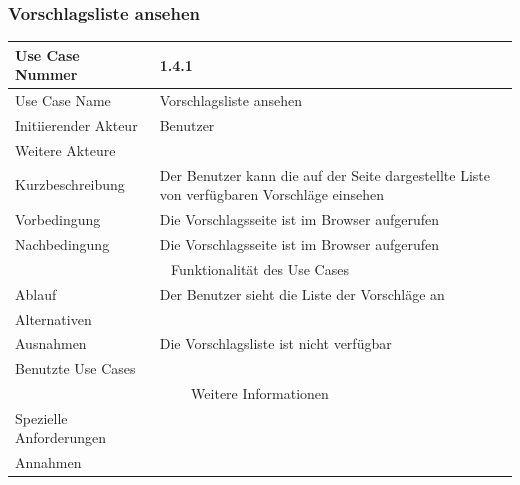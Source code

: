 \documentclass[10pt,a4paper]{article}
\begin{document}
	\subsubsection{Vorschlagsliste ansehen}
	\begin{tabular}{|l|p{.5\linewidth}|}
		\hline Use Case Nummer & 1.4.1 \\ 
		\hline Use Case Name & Vorschlagsliste ansehen \\ 
		\hline Initiierender Akteur & Benutzer \\
		\hline Weitere Akteure & \\
		\hline Kurzbeschreibung & Der Benutzer kann die auf der Seite dargestellte Liste von verf\"ugbaren Vorschl\"age einsehen \\
		\hline Vorbedingung & Die Vorschlagsseite ist im Browser aufgerufen \\
		\hline Nachbedingung & Die Vorschlagsseite ist im Browser aufgerufen \\
		\hline \multicolumn{2}{|c|}{Funktionalität des Use Cases}\\
		\hline Ablauf & Der Benutzer sieht die Liste der Vorschl\"age an\\
		\hline Alternativen &  \\
		\hline Ausnahmen & Die Vorschlagsliste ist nicht verf\"ugbar \\
		\hline Benutzte Use Cases & \\
		\hline \multicolumn{2}{|c|}{Weitere Informationen} \\
		\hline Spezielle Anforderungen &  \\
		\hline Annahmen &  \\
		\hline
	\end{tabular}	
	
\end{document}
